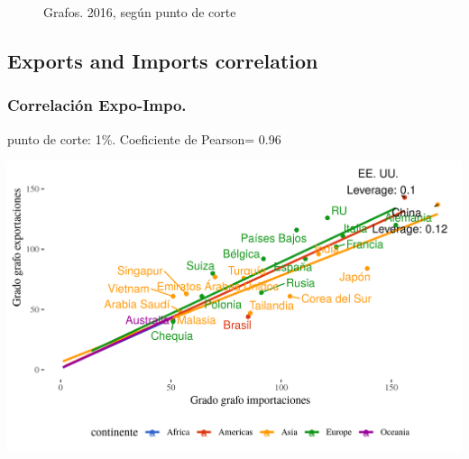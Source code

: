 \documentclass[compress]{beamer}
\begin{document}
\begin{frame}
\begin{figure}
		\caption{Grafos. 2016, según punto de corte}
		\label{fig:grafo_2016}
	\end{figure}
	
\end{frame}




\subsection{Exports and Imports correlation}
\begin{frame}


\frametitle{Correlación Expo-Impo.}

punto de corte: 1\%.
Coeficiente de Pearson= 0.96

\includegraphics[width=\linewidth]{Graficos/corr_grados_2016_1_pcnt}

\end{frame}
\end{document}
